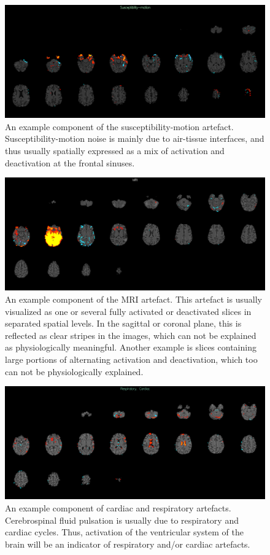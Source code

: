 \begin{figure}[H]                 
	\includegraphics[width=.85\textwidth]{figures/bMethods/Susceptibility_motion}  
	\caption{An example component of the susceptibility-motion artefact. Susceptibility-motion noise is mainly due to air-tissue interfaces, and thus usually spatially expressed as a mix of activation and deactivation at the frontal sinuses.}
	\label{fig:meth:sus} 
\end{figure}

\begin{figure}[H]                 
	\includegraphics[width=.85\textwidth]{figures/bMethods/MRI}  
	\caption{An example component of the MRI artefact. This artefact is usually visualized as one or several fully activated or deactivated slices in separated spatial levels. In the sagittal or coronal plane, this is reflected as clear stripes in the images, which can not be explained as physiologically meaningful. Another example is slices containing large portions of alternating activation and deactivation, which too can not be physiologically explained.}
	\label{fig:meth:MRI} 
\end{figure}

\begin{figure}[H]                 
	\includegraphics[width=.85\textwidth]{figures/bMethods/card_resp}  
	\caption{An example component of cardiac and respiratory artefacts. Cerebrospinal fluid pulsation is usually due to respiratory and cardiac cycles. Thus, activation of the ventricular system of the brain will be an indicator of respiratory and/or cardiac artefacts.}
	\label{fig:meth:phys} 
\end{figure}

